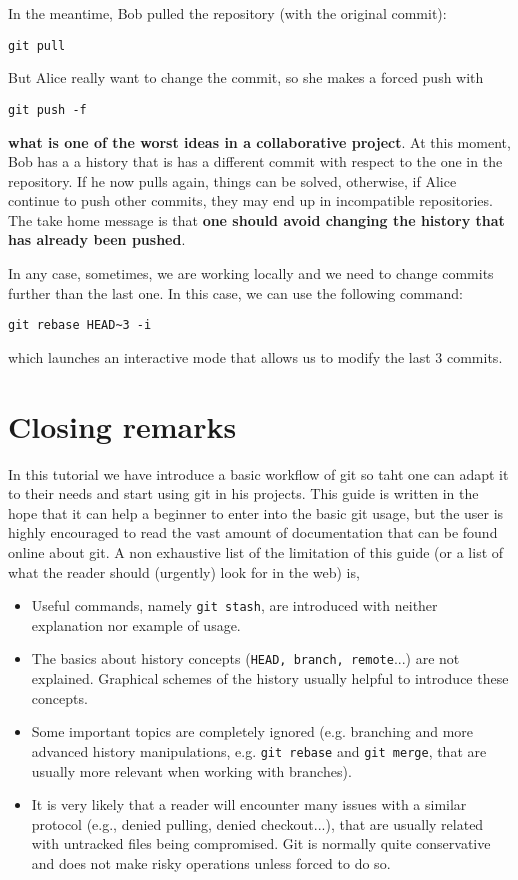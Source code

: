 \documentclass[a4paper,10pt]{article}
\begin{document}
In the meantime, Bob pulled the repository (with the original commit):

\begin{lstlisting}[style=Bob]
 git pull
\end{lstlisting}

But Alice really want to change the commit, so she makes a forced push with

\begin{lstlisting}[style=Alice]
 git push -f
\end{lstlisting}
\textbf{what is one of the worst ideas in a collaborative project}. At this moment, Bob has a a history that is has a different commit with respect to the one in the repository. If he now pulls again, things can be solved, otherwise, if Alice continue to push other commits, they may end up in incompatible repositories. The take home message is that \textbf{one should avoid changing the history that has already been pushed}.

In any case, sometimes, we are working locally and we need to change commits further than the last one. In this case, we can use the following command:

\begin{lstlisting}[style=Alice]
 git rebase HEAD~3 -i
\end{lstlisting}
which launches an interactive mode that allows us to modify the last 3 commits. 

\clearpage

\section{Closing remarks}

In this tutorial we have introduce a basic workflow of git so taht one can adapt it to their needs and start using git in his projects. This guide is written in the hope that it can help a beginner to enter into the basic git usage, but the user is highly encouraged to read the vast amount of documentation that can be found online about git. A non exhaustive list of the limitation of this guide (or a list of what the reader should (urgently) look for in the web) is,

\begin{itemize}
 \item Useful commands, namely \texttt{git stash}, are introduced with neither explanation nor example of usage.
 \item The basics about history concepts (\texttt{HEAD, branch, remote}...) are not explained. Graphical schemes of the history usually helpful to introduce these concepts.
 \item Some important topics are completely ignored (e.g. branching and more advanced history manipulations, e.g. \texttt{git rebase} and \texttt{git merge}, that are usually more  relevant when working with branches).
 \item It is very likely that a reader will encounter many issues with a similar protocol (e.g., denied pulling, denied checkout...), that are usually related with untracked files being compromised. Git is normally quite conservative and does not make risky operations unless forced to do so.
\end{itemize}
\end{document}
